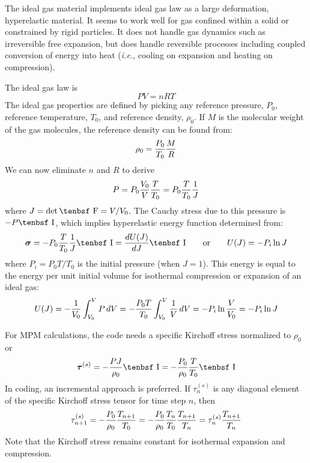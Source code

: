 \documentclass[11pt]{book}
\renewcommand{\vec}[1]{\boldsymbol{#1}}
\def\F{\hbox{\tenbsf F}}
\def\I{\hbox{\tenbsf I}}
\begin{document}
The ideal gas material implements ideal gas law as a large deformation, hyperelastic material. It seems to work well for gas confined within a solid or constrained by rigid particles. It does not handle gas dynamics such as irreversible free expansion, but does handle reversible processes including coupled conversion of energy into heat ({\em i.e.}, cooling on expansion and heating on compression).

The ideal gas law is
\begin{equation}
    PV = nRT
\end{equation}
The ideal gas properties are defined by picking any reference pressure, $P_0$, reference temperature, $T_0$, and reference density, $\rho_0$. If $M$ is the molecular weight of the gas molecules, the reference density can be found from:
\begin{equation}
    \rho_0 = {P_0\over T_0} {M\over R}
\end{equation}
We can now eliminate $n$ and $R$ to derive
\begin{equation}
    P = P_0{V_0\over V}{T\over T_0} = P_0 {T\over T_0} {1\over J} \label{geniglaw}
\end{equation}
where $J = \det \F = V/V_0$. The Cauchy stress due to this pressure is $-P\I$, which implies hyperelastic energy function determined from:
\begin{equation}
    \vec\sigma = - P_0 {T\over T_0} {1\over J}\I = {dU(J)\over dJ}\I
        \qquad{\rm or}\qquad
         U(J) = - P_i \ln J
\end{equation}
where $P_i = P_0T/T_0$ is the initial pressure (when $J=1$). This energy is equal to the energy per unit initial volume for isothermal compression or expansion of an ideal gas:
\begin{equation}
    U(J) = - {1\over V_0} \int_{V_0}^V P\thinspace dV = - {P_0T\over T_0} \int_{V_0}^V {1\over V}\thinspace dV = - P_i \ln {V\over V_0} = - P_i \ln J
\end{equation}

For MPM calculations, the code needs a specific Kirchoff stress normalized to $\rho_0$ or
\begin{equation}
    \vec\tau^{(s)} = -{PJ\over \rho_0}\I  = - {P_0\over \rho_0} {T\over T_0}\I
\end{equation}
In coding, an incremental approach is preferred. 
If $\tau_n^{(s)}$ is any diagonal element of the specific Kirchoff stress tensor for time step $n$, then
\begin{equation}
   \tau_{n+1}^{(s)} = - {P_0\over \rho_0} {T_{n+1}\over T_0}  = - {P_0\over \rho_0} {T_n\over T_0} {T_{n+1}\over T_n}
       = \tau_n^{(s)} {T_{n+1}\over T_n}
\end{equation}
Note that the Kirchoff stress remains constant for isothermal expansion and compression.
\end{document}
